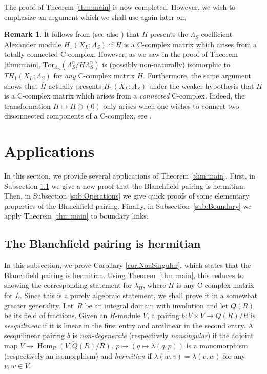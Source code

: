 \documentclass[11pt,a4paper]{amsart}
\theoremstyle{definition}
\newtheorem{remark}[theorem]{Remark}
\def\op{\operatorname}
\begin{document}
The proof of Theorem \ref{thm:main} is now completed. However, we wish to emphasize an argument which we shall use again later on.
\begin{remark}
\label{rem:LambdaSPresentation}
It follows from \cite[Corollary 3.6]{CimasoniFlorens} (see also  \cite[Theorem 1.1]{ConwayFriedlToffoli}) that $\overline{H}$ presents the $\Lambda_S$-coefficient Alexander module $H_1(X_L;\Lambda_S)$ if $H$ is a C-complex matrix which arises from a totally connected C-complex. However, as we saw in the proof of Theorem \ref{thm:main}, $\text{Tor}_{\Lambda_S}(\Lambda_S^n / \overline{H} \Lambda_S^n)$ is (possibly non-naturally) isomorphic to $TH_1(X_L;\Lambda_S)$ for \emph{any} C-complex matrix $H$. Furthermore, the same argument shows that $\overline{H}$ actually presents $H_1(X_L;\Lambda_S)$ under the weaker hypothesis that $H$ is a C-complex matrix which arises from a \emph{connected} C-complex. Indeed, the transformation $H \mapsto H \oplus (0)$ only arises when one wishes to connect two disconnected components of a C-complex, see \cite[page 1230]{CimasoniFlorens}.
\end{remark}

\section{Applications}
\label{sec:Applications}

In this section, we provide several applications of Theorem \ref{thm:main}. First, in Subsection \ref{sub:NonSing} we give a new proof that the Blanchfield pairing is hermitian. Then, in Subsection \ref{sub:Operations} we give quick proofs of some elementary properties of the Blanchfield pairing. Finally, in Subsection~\ref{sub:Boundary} we apply Theorem \ref{thm:main} to boundary links.

\subsection{The Blanchfield pairing is hermitian}
\label{sub:NonSing}
In this subsection, we prove Corollary \ref{cor:NonSingular}, which states that the Blanchfield pairing is hermitian.
Using Theorem~\ref{thm:main}, this reduces to showing the corresponding statement for $\lambda_H$, where $H$ is any C-complex matrix for $L$. Since this is a purely algebraic statement, we shall prove it in a somewhat greater generality. 
\medbreak
Let~$R$ be an integral domain with involution and let $Q(R)$ be its field of fractions. Given an $R$-module $V$, a pairing $b \colon V \times V \to Q(R)/R$ is \emph{sesquilinear} if it is linear in the first entry and antilinear in the second entry. A sesquilinear pairing $b$ is \emph{non-degenerate} (respectively \emph{nonsingular}) if the adjoint map $ V \to  \overline{\op{Hom}_R(V,Q(R)/R)}, \ 
p  \mapsto  (q \mapsto \lambda(q,p)) $
is a monomorphism (respectively an isomorphism) and  \emph{hermitian} if $\overline{\lambda(w,v)}=\lambda(v,w)$ for any $v,w\in V$.
\end{document}
